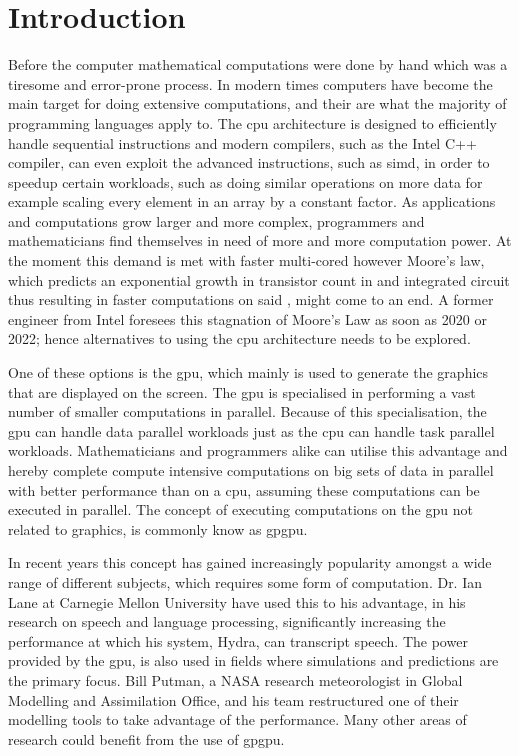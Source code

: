 \chapter{Introduction} %
\label{cha:introduction}
Before the computer mathematical computations were done by hand which was a tiresome and error-prone process.
In modern times computers have become the main target for doing extensive computations, and their  are what the majority of programming languages apply to.
The \acrshort{cpu} architecture is designed to efficiently handle sequential instructions and modern compilers, such as the Intel C++ compiler, can even exploit the   advanced instructions, such as \acrfull{simd}, in order to speedup certain workloads, such as doing similar operations on more data for example scaling every element in an array by a constant factor. \citep{INTEL_SIMD}
As applications and computations grow larger and more complex, programmers and mathematicians find themselves in need of more and more computation power. \citep[pp. 4]{OpenCL_AMD}
At the moment this demand is met with faster multi-cored  however Moore's law, which predicts an exponential growth in transistor count in and integrated circuit thus resulting in faster computations on said , might come to an end.
A former engineer from Intel foresees this stagnation of Moore's Law as soon as 2020 or 2022; hence alternatives to using the \acrshort{cpu} architecture needs to be explored.\citep{Moore2013}

One of these options is the \acrfull{gpu}, which mainly is used to generate the graphics that are displayed on the screen.
The \acrshort{gpu} is specialised in performing a vast number of smaller computations in parallel.
Because of this specialisation, the \acrshort{gpu} can handle data parallel workloads just as the \acrshort{cpu} can handle task parallel workloads.
Mathematicians and programmers alike can utilise this advantage and hereby complete compute intensive computations on big sets of data in parallel with better performance than on a \acrshort{cpu}, assuming these computations can be executed in parallel.
The concept of executing computations on the \acrshort{gpu} not related to graphics, is commonly know as \acrfull{gpgpu}.

In recent years this concept has gained increasingly popularity amongst a wide range of different subjects, which requires some form of computation.
Dr. Ian Lane at Carnegie Mellon University have used this to his advantage, in his research on speech and language processing, significantly increasing the performance at which his system, Hydra, can transcript speech. \citep{NvidiaSpotlightIan}
The power provided by the \acrshort{gpu}, is also used in fields where simulations and predictions are the primary focus. 
Bill Putman, a NASA research meteorologist in Global Modelling and Assimilation Office, and his team restructured one of their modelling tools to take advantage of the  performance. \citep{NvidiaSpotlightNasa}
Many other areas of research could benefit from the use of \acrshort{gpgpu}.

